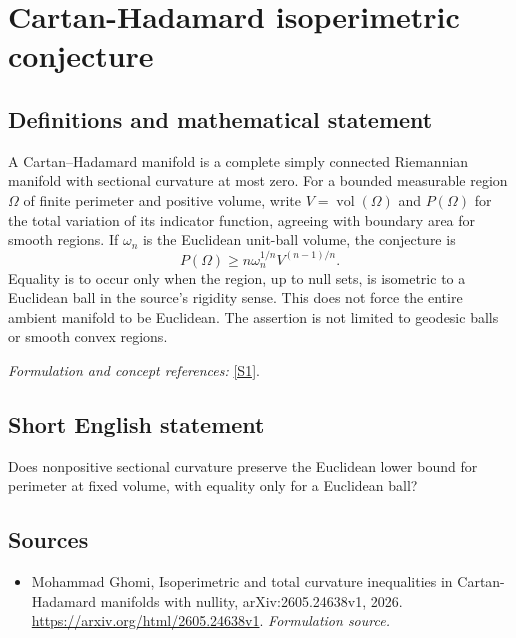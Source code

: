 \documentclass[11pt]{article}
\begin{document}
\section*{\texorpdfstring{Cartan-Hadamard isoperimetric conjecture}{Cartan-Hadamard isoperimetric conjecture}}\label{30006828}
\subsection{Definitions and mathematical statement}
A Cartan--Hadamard manifold is a complete simply connected Riemannian manifold with sectional curvature at most zero. For a bounded measurable region $\Omega$ of finite perimeter and positive volume, write $V=\operatorname{vol}(\Omega)$ and $P(\Omega)$ for the total variation of its indicator function, agreeing with boundary area for smooth regions. If $\omega_n$ is the Euclidean unit-ball volume, the conjecture is
\[
 P(\Omega)\ge n\omega_n^{1/n}V^{(n-1)/n}.
\]
Equality is to occur only when the region, up to null sets, is isometric to a Euclidean ball in the source's rigidity sense. This does not force the entire ambient manifold to be Euclidean. The assertion is not limited to geodesic balls or smooth convex regions.
\par\smallskip\textit{Formulation and concept references:} \href{https://arxiv.org/html/2605.24638v1}{[S1]}.

\subsection{Short English statement}
Does nonpositive sectional curvature preserve the Euclidean lower bound for perimeter at fixed volume, with equality only for a Euclidean ball?
\subsection{Sources}
\begin{itemize}
\item[S1]Mohammad Ghomi, Isoperimetric and total curvature inequalities in Cartan-Hadamard manifolds with nullity, arXiv:2605.24638v1, 2026.
\url{https://arxiv.org/html/2605.24638v1}.
\textit{Formulation source.}
\end{itemize}
\end{document}
